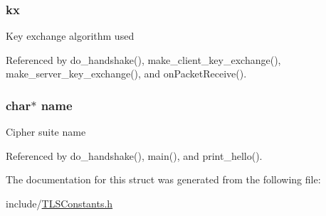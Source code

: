 \subsubsection[{\texorpdfstring{kx}{kx}}]{ kx}\hypertarget{structcipher__suite__t_ad84bfc73673c813712dbbc08d89c53a9}{}\label{structcipher__suite__t_ad84bfc73673c813712dbbc08d89c53a9}
Key exchange algorithm used 

Referenced by do\+\_\+handshake(), make\+\_\+client\+\_\+key\+\_\+exchange(), make\+\_\+server\+\_\+key\+\_\+exchange(), and on\+Packet\+Receive().

\subsubsection[{\texorpdfstring{name}{name}}]{\setlength{\rightskip}{0pt plus 5cm}char$\ast$ name}\hypertarget{structcipher__suite__t_a5ac083a645d964373f022d03df4849c8}{}\label{structcipher__suite__t_a5ac083a645d964373f022d03df4849c8}
Cipher suite name 

Referenced by do\+\_\+handshake(), main(), and print\+\_\+hello().



The documentation for this struct was generated from the following file\+:\begin{DoxyCompactItemize}
\item 
include/\hyperlink{_t_l_s_constants_8h}{T\+L\+S\+Constants.\+h}\end{DoxyCompactItemize}
